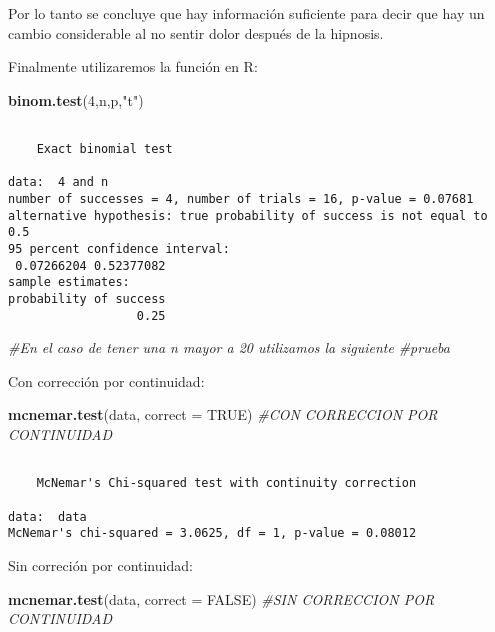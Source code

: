\documentclass[a4paper,oneside,openany]{book}
\newenvironment{Shaded}{\begin{snugshade}}{\end{snugshade}}
\newcommand{\KeywordTok}[1]{\textcolor[rgb]{0.13,0.29,0.53}{\textbf{#1}}}
\newcommand{\DataTypeTok}[1]{\textcolor[rgb]{0.13,0.29,0.53}{#1}}
\newcommand{\DecValTok}[1]{\textcolor[rgb]{0.00,0.00,0.81}{#1}}
\newcommand{\StringTok}[1]{\textcolor[rgb]{0.31,0.60,0.02}{#1}}
\newcommand{\CommentTok}[1]{\textcolor[rgb]{0.56,0.35,0.01}{\textit{#1}}}
\newcommand{\OtherTok}[1]{\textcolor[rgb]{0.56,0.35,0.01}{#1}}
\newcommand{\NormalTok}[1]{#1}
\begin{document}
Por lo tanto se concluye que hay información suficiente para decir que
hay un cambio considerable al no sentir dolor después de la hipnosis.

Finalmente utilizaremos la función en R:

\begin{Shaded}
\begin{Highlighting}[]
\KeywordTok{binom.test}\NormalTok{(}\DecValTok{4}\NormalTok{,n,p,}\StringTok{"t"}\NormalTok{)}
\end{Highlighting}
\end{Shaded}

\begin{verbatim}

    Exact binomial test

data:  4 and n
number of successes = 4, number of trials = 16, p-value = 0.07681
alternative hypothesis: true probability of success is not equal to 0.5
95 percent confidence interval:
 0.07266204 0.52377082
sample estimates:
probability of success 
                  0.25 
\end{verbatim}

\begin{Shaded}
\begin{Highlighting}[]
\CommentTok{#En el caso de tener una n mayor a 20 utilizamos la siguiente}
\CommentTok{#prueba}
\end{Highlighting}
\end{Shaded}

Con corrección por continuidad:

\begin{Shaded}
\begin{Highlighting}[]
\KeywordTok{mcnemar.test}\NormalTok{(data, }\DataTypeTok{correct =} \OtherTok{TRUE}\NormalTok{) }\CommentTok{#CON CORRECCION POR CONTINUIDAD}
\end{Highlighting}
\end{Shaded}

\begin{verbatim}

    McNemar's Chi-squared test with continuity correction

data:  data
McNemar's chi-squared = 3.0625, df = 1, p-value = 0.08012
\end{verbatim}

Sin correción por continuidad:

\begin{Shaded}
\begin{Highlighting}[]
\KeywordTok{mcnemar.test}\NormalTok{(data, }\DataTypeTok{correct =} \OtherTok{FALSE}\NormalTok{) }\CommentTok{#SIN CORRECCION POR CONTINUIDAD}
\end{Highlighting}
\end{Shaded}
\end{document}

